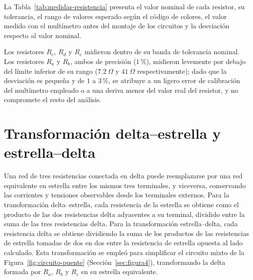 \documentclass[conference,10pt]{IEEEtran}
\begin{document}
La Tabla~\ref{tab:medidas-resistencia} presenta el valor nominal de cada resistor, su tolerancia, el rango de valores esperado según el código de colores, el valor medido con el multímetro antes del montaje de los circuitos y la desviación respecto al valor nominal.

\begin{table}[H]
  \caption{Tabla Valores Medidos de Resistencia}
  \label{tab:medidas-resistencia}
  \centering
\end{table}

\noindent Los resistores $R_c$, $R_d$ y $R_e$ midieron dentro de su banda de tolerancia nominal. Los resistores $R_a$ y $R_b$, ambos de precisión ($1\,\%$), midieron levemente por debajo del límite inferior de su rango ($7.2~\Omega$ y $41~\Omega$ respectivamente); dado que la desviación es pequeña y de $1$ a $3\,\%$, se atribuye a un ligero error de calibración del multímetro empleado o a una deriva menor del valor real del resistor, y no compromete el resto del análisis.

\section{Transformación delta--estrella y estrella--delta}
\label{sec:transformacion}
Una red de tres resistencias conectada en delta puede reemplazarse por una red equivalente en estrella entre los mismos tres terminales, y viceversa, conservando las corrientes y tensiones observables desde los terminales externos. Para la transformación delta--estrella, cada resistencia de la estrella se obtiene como el producto de las dos resistencias delta adyacentes a su terminal, dividido entre la suma de las tres resistencias delta. Para la transformación estrella--delta, cada resistencia delta se obtiene dividiendo la suma de los productos de las resistencias de estrella tomadas de dos en dos entre la resistencia de estrella opuesta al lado calculado. Esta transformación se empleó para simplificar el circuito mixto de la Figura~\ref{fig:circuito-puente} (Sección~\ref{sec:figura4}), transformando la delta formada por $R_a$, $R_b$ y $R_c$ en su estrella equivalente.
\end{document}
